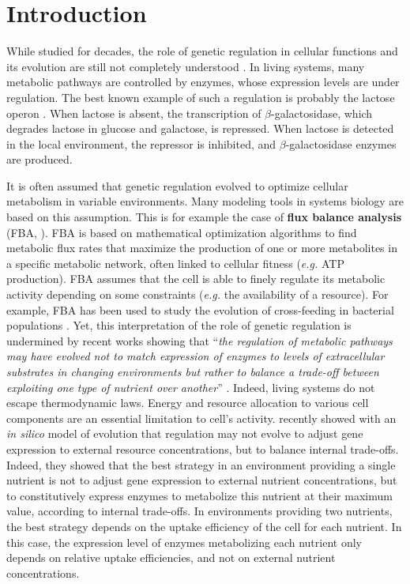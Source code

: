 
\section{Introduction}
\label{sec:part2:second_result:introduction}

While studied for decades, the role of genetic regulation in cellular functions and its evolution are still not completely understood \citep{savageau-1998,shinar-et-al-2006}. In living systems, many metabolic pathways are controlled by enzymes, whose expression levels are under regulation. The best known example of such a regulation is probably the lactose operon \citep{jacob-and-monod-1961}. When lactose is absent, the transcription of $\beta$-galactosidase, which degrades lactose in glucose and galactose, is repressed. When lactose is detected in the local environment, the repressor is inhibited, and $\beta$-galactosidase enzymes are produced.

It is often assumed that genetic regulation evolved to optimize cellular metabolism in variable environments. Many modeling tools in systems biology are based on this assumption. This is for example the case of \textbf{flux balance analysis} (FBA, \citealt{orth-et-al-2010}). FBA is based on mathematical optimization algorithms to find metabolic flux rates that maximize the production of one or more metabolites in a specific metabolic network, often linked to cellular fitness (\textit{e.g.} ATP production). FBA assumes that the cell is able to finely regulate its metabolic activity depending on some constraints (\textit{e.g.} the availability of a resource). For example, FBA has been used to study the evolution of cross-feeding in bacterial populations \citep{grosskopf-et-al-2016}.
Yet, this interpretation of the role of genetic regulation is undermined by recent works showing that ``\textit{the regulation of metabolic pathways may have evolved not to match expression of enzymes to levels of extracellular substrates in changing environments but rather to balance a trade-off between exploiting one type of nutrient over another}'' \citep{weisse-et-al-2015}. Indeed, living systems do not escape thermodynamic laws. Energy and resource allocation to various cell components are an essential limitation to cell's activity. \cite{weisse-et-al-2015} recently showed with an \textit{in silico} model of evolution that regulation may not evolve to adjust gene expression to external resource concentrations, but to balance internal trade-offs. Indeed, they showed that the best strategy in an environment providing a single nutrient is not to adjust gene expression to external nutrient concentrations, but to constitutively express enzymes to metabolize this nutrient at their maximum value, according to internal trade-offs. In environments providing two nutrients, the best strategy depends on the uptake efficiency of the cell for each nutrient. In this case, the expression level of enzymes metabolizing each nutrient only depends on relative uptake efficiencies, and not on external nutrient concentrations.

